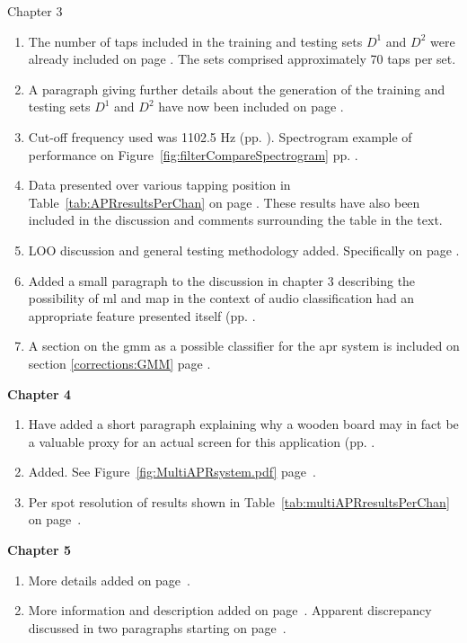 Chapter 3
\begin{enumerate}
\item The number of taps included in the training and testing sets $D^1$ and $D^2$ were already included on page \pageref{corrections:DSNcount}. The sets comprised approximately 70 taps per set.
\item A paragraph giving further details about the generation of the training and testing sets $D^1$ and $D^2$ have now been included on page \pageref{corrections:DSNmethod}.
\item Cut-off frequency used was 1102.5 Hz (pp. \pageref{corrections:cut-off}). Spectrogram example of performance on Figure~\ref{fig:filterCompareSpectrogram} pp. \pageref{fig:filterCompareSpectrogram}.
\item Data presented over various tapping position in Table~\ref{tab:APRresultsPerChan} on page \pageref{tab:APRresultsPerChan}. These results have also been included in the discussion and comments surrounding the table in the text.
\item LOO discussion and general testing methodology added. Specifically on page \pageref{corrections:LOO}.
\item Added a small paragraph to the discussion in chapter 3 describing the possibility of \gls{ml} and \gls{map} in the context of audio classification had an appropriate feature presented itself (pp. \pageref{corrections:ML}.
\item A section on the \gls{gmm} as a possible classifier for the \gls{apr} system is included on section \ref{corrections:GMM} page \pageref{corrections:GMM}.
\end{enumerate}

\textbf{Chapter 4}
\begin{enumerate}
\item Have added a short paragraph explaining why a wooden board may in fact be a valuable proxy for an actual screen for this application (pp. \label{corrections:wooden}.
\item Added. See Figure~\ref{fig:MultiAPRsystem.pdf} page~\pageref{fig:MultiAPRsystem.pdf}.
\item Per spot resolution of results shown in Table~\ref{tab:multiAPRresultsPerChan} on page~\pageref{tab:multiAPRresultsPerChan}.
\end{enumerate}

\textbf{Chapter 5}
\begin{enumerate}
\item More details added on page~\pageref{corrections:library}.
\item More information and description added on page~\pageref{corrections:further_quantify}. Apparent discrepancy discussed in two paragraphs starting on page~\pageref{corrections:discuss_discrep}.
\end{enumerate}

